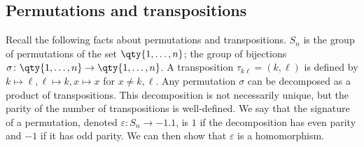 \subsection{Permutations and transpositions}
Recall the following facts about permutations and transpositions.
$S_n$ is the group of permutations of the set $\qty{1, \dots, n}$; the group of bijections $\sigma \colon \qty{1, \dots, n} \to \qty{1, \dots, n}$.
A transposition $\tau_{k \ell} = (k, \ell)$ is defined by $k \mapsto \ell, \ell \mapsto k, x \mapsto x$ for $x \neq k, \ell$.
Any permutation $\sigma$ can be decomposed as a product of transpositions.
This decomposition is not necessarily unique, but the parity of the number of transpositions is well-defined.
We say that the signature of a permutation, denoted $\varepsilon \colon S_n \to \qty{-1, 1}$, is $1$ if the decomposition has even parity and $-1$ if it has odd parity.
We can then show that $\varepsilon$ is a homomorphism.

